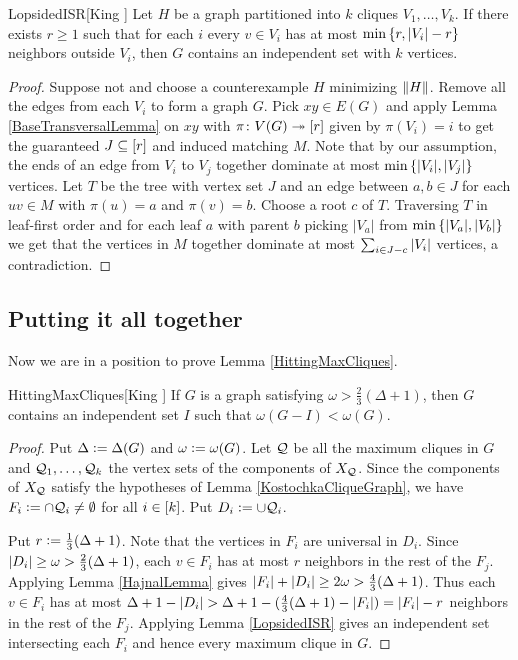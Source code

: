 \begin{replem}{LopsidedISR}[King \cite{KingHitting}]
Let $H$ be a graph partitioned into $k$ cliques $V_1, \ldots, V_k$.  If there
exists $r \geq 1$ such that for each $i$ every $v \in V_i$ has at most
$\min\left\{ r, \left|V_i\right| - r \right\}$ neighbors outside $V_i$, then $G$ contains an
independent set with $k$ vertices.
\end{replem}
\begin{proof}
Suppose not and choose a counterexample $H$ minimizing $\left\Vert H\right\Vert$.  Remove all
the edges from each $V_i$ to form a graph $G$. Pick $xy \in E(G)$ and apply
Lemma \ref{BaseTransversalLemma} on $xy$ with $\pi\colon V(G) \twoheadrightarrow \left[r\right]$ given by $\pi(V_i) = i$ to get the guaranteed $J \subseteq \left[r\right]$ and induced matching $M$.  Note that by our assumption,
the ends of an edge from $V_i$ to $V_j$ together dominate at most $\min\left\{ |V_i|, |V_j| \right\}$
vertices.  Let $T$ be the tree with vertex set $J$ and an edge between $a, b \in
J$ for each $uv \in M$ with $\pi(u) = a$ and $\pi(v) = b$.  Choose a root $c$ of
$T$. Traversing $T$ in leaf-first order and for each leaf $a$ with
parent $b$ picking $|V_a|$ from $\min\left\{ |V_a|, |V_b| \right\}$ we get that the vertices in $M$ together dominate
at most $\sum_{i \in J - c} \left|V_i\right|$ vertices, a contradiction.
\end{proof}

\subsection{Putting it all together}
Now we are in a position to prove Lemma \ref{HittingMaxCliques}.

\begin{replem}{HittingMaxCliques}[King \cite{KingHitting}]
If $G$ is a graph satisfying $\omega > \frac23 (\Delta + 1)$, then $G$ contains
an independent set $I$ such that $\omega(G - I) < \omega(G)$.
\end{replem}
\begin{proof}
Put $\Delta \mathrel{\mathop:}= \Delta(G)$ and $\omega \mathrel{\mathop:}= \omega(G)$. Let $\mathcal{Q}$ be all the maximum cliques in $G$ and $\mathcal{Q}_1, \ldots, \mathcal{Q}_k$ the vertex sets of the components of $X_{\mathcal{Q}}$.  Since the components of $X_{\mathcal{Q}}$ satisfy the hypotheses of Lemma \ref{KostochkaCliqueGraph}, we have $F_i \mathrel{\mathop:}= \cap \mathcal{Q}_i \neq \emptyset$ for all $i \in \left[k\right]$.  Put $D_i \mathrel{\mathop:}= \cup \mathcal{Q}_i$. 

Put $r \mathrel{\mathop:}= \frac13(\Delta + 1)$.  Note that the vertices in $F_i$ are universal in $D_i$.  Since $\left|D_i\right| \geq \omega > \frac23 (\Delta + 1)$, each $v \in F_i$ has at most $r$ neighbors in the rest of the $F_j$. Applying Lemma \ref{HajnalLemma} gives $\left|F_i\right| + \left|D_i\right| \geq 2\omega > \frac{4}{3}(\Delta + 1)$.  Thus each $v \in F_i$ has at most $\Delta + 1 - \left|D_i\right| > \Delta + 1 - (\frac{4}{3}(\Delta + 1) - \left|F_i\right|) = \left|F_i\right| - r$ neighbors in the rest of the $F_j$. Applying Lemma \ref{LopsidedISR} gives an independent set intersecting each $F_i$ and hence every maximum clique in $G$.
\end{proof}

